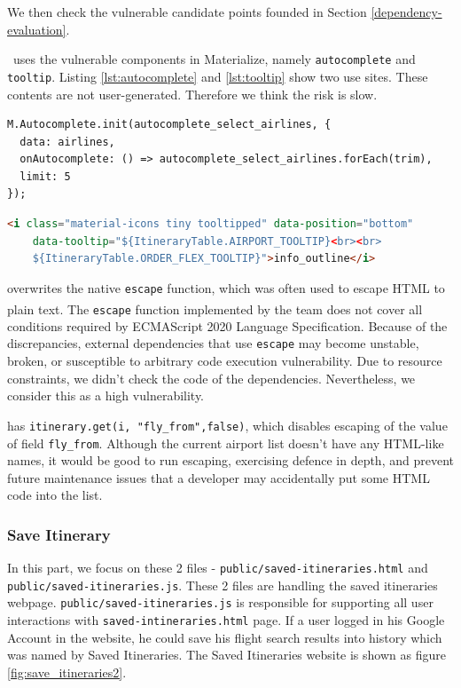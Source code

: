 \documentclass[12pt, a4paper]{article}
\newcommand{\code}[1]{\texttt{#1}}
\begin{document}
We then check the vulnerable candidate points founded in Section \ref{dependency-evaluation}.

\theproject\ uses the vulnerable components in Materialize, namely \code{autocomplete} and \code{tooltip}. Listing \ref{lst:autocomplete} and \ref{lst:tooltip} show two use sites. These contents are not user-generated. Therefore we think the risk is slow.

\begin{lstlisting}[frame=tb, caption=itinerary-table.js loads airlines to autocomplete, label=lst:autocomplete]
M.Autocomplete.init(autocomplete_select_airlines, {
  data: airlines,
  onAutocomplete: () => autocomplete_select_airlines.forEach(trim),
  limit: 5
});
\end{lstlisting}

\begin{lstlisting}[language=html, frame=tb, caption=itinerary-table.js loads airlines to tooltip, label=lst:tooltip]
<i class="material-icons tiny tooltipped" data-position="bottom"
    data-tooltip="${ItineraryTable.AIRPORT_TOOLTIP}<br><br>
    ${ItineraryTable.ORDER_FLEX_TOOLTIP}">info_outline</i>
\end{lstlisting}


 overwrites the native \code{escape} function, which was often used to escape HTML to plain text\textsuperscript{\cite{native-escape}}. The \code{escape} function implemented by the team does not cover all conditions required by ECMAScript 2020 Language Specification. Because of the discrepancies, external dependencies that use \code{escape} may become unstable, broken, or susceptible to arbitrary code execution vulnerability. Due to resource constraints, we didn't check the code of the dependencies. Nevertheless, we consider this as a high vulnerability.

 has \code{itinerary.get(i, "fly\_from",\linebreak[4] false)}, which disables escaping of the value of field \code{fly\_from}. Although the current airport list doesn't have any HTML-like names, it would be good to run escaping, exercising defence in depth, and prevent future maintenance issues that a developer may accidentally put some HTML code into the list.

\subsubsection{Save Itinerary}
In this part, we focus on these 2 files - \code{public/saved-itineraries.html} and \code{public/saved-itineraries.js}. These 2 files are handling the saved itineraries webpage. \code{public/saved-itineraries.js} is responsible for supporting all user interactions with \code{saved-intineraries.html} page. If a user logged in his Google Account in the website, he could save his flight search results into history which was named by Saved Itineraries. The Saved Itineraries website is shown as figure \ref{fig:save_itineraries2}. 
\end{document}
